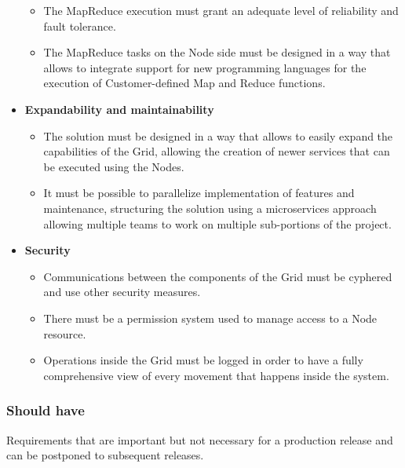\begin{itemize}
    \begin{itemize}
        \item The MapReduce execution must grant an adequate level of reliability and fault tolerance.
        \item The MapReduce tasks on the Node side must be designed in a way that allows to integrate support for new programming  languages for the execution of Customer-defined Map and Reduce functions.
    \end{itemize}
    \item \textbf{Expandability and maintainability}
    \begin{itemize}
        \item The solution must be designed in a way that allows to easily expand the capabilities of the Grid, allowing the creation of newer services that can be executed using the Nodes.
        \item It must be possible to parallelize implementation of features and maintenance, structuring the solution using a microservices approach allowing multiple teams to work on multiple sub-portions of the project.
    \end{itemize}
    \item \textbf{Security}
    \begin{itemize}
        \item Communications between the components of the Grid must be cyphered and use other security measures.
        \item There must be a permission system used to manage access to a Node resource.
        \item Operations inside the Grid must be logged in order to have a fully comprehensive view of every movement that happens inside the system.
    \end{itemize}
\end{itemize}

\subsubsection{Should have}
Requirements that are important but not necessary for a production release and can be postponed to subsequent releases.

